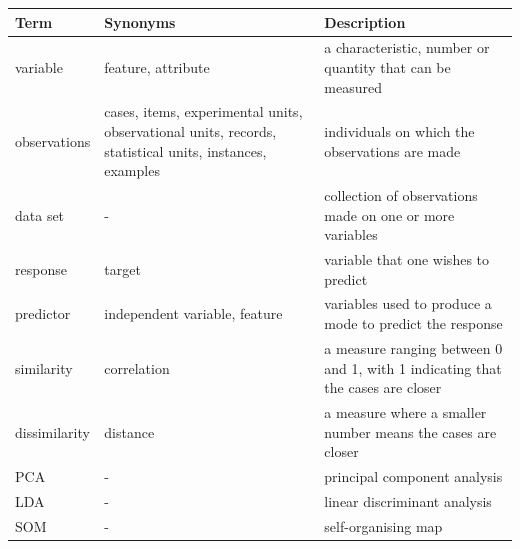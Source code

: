 \documentclass[
  letterpaper,
]{book}
\begin{document}
\begin{longtable}{lll}
\toprule
Term & Synonyms & Description \\ 
\midrule
variable & feature, attribute & a characteristic, number or quantity that can be measured \\ 
observations & cases, items, experimental units, observational units, records, statistical units, instances, examples & individuals on which the observations are made \\ 
data set & - & collection of observations made on one or more variables \\ 
response & target & variable that one wishes to predict \\ 
predictor & independent variable, feature & variables used to produce a mode to predict the response \\ 
similarity & correlation & a measure ranging between 0 and 1, with 1 indicating that the cases are closer \\ 
dissimilarity & distance & a measure where a smaller number means the cases are closer \\ 
PCA & - & principal component analysis \\ 
LDA & - & linear discriminant analysis \\ 
SOM & - & self-organising map \\ 
\bottomrule
\end{longtable}


\backmatter

\printindex
\end{document}
